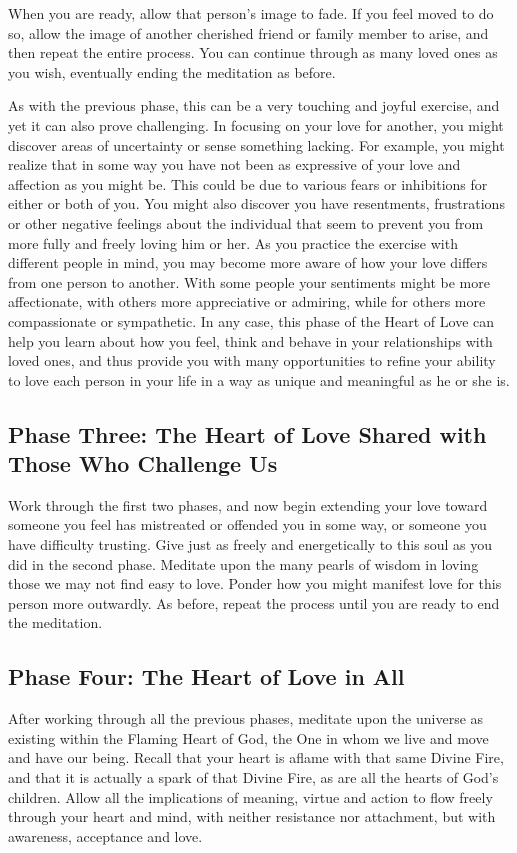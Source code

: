 \documentclass{article}
\begin{document}
When you are ready, allow that person’s image to fade. If you feel moved to do so, allow
the image of another cherished friend or family member to arise, and then repeat the
entire process. You can continue through as many loved ones as you wish, eventually
ending the meditation as before.

As with the previous phase, this can be a very touching and joyful exercise, and yet it can
also prove challenging. In focusing on your love for another, you might discover areas of uncertainty or sense something lacking. For example, you might realize that in some way
you have not been as expressive of your love and affection as you might be. This could
be due to various fears or inhibitions for either or both of you. You might also discover
you have resentments, frustrations or other negative feelings about the individual that
seem to prevent you from more fully and freely loving him or her. As you practice the
exercise with different people in mind, you may become more aware of how your love
differs from one person to another. With some people your sentiments might be more
affectionate, with others more appreciative or admiring, while for others more
compassionate or sympathetic. In any case, this phase of the Heart of Love can help you
learn about how you feel, think and behave in your relationships with loved ones, and
thus provide you with many opportunities to refine your ability to love each person in
your life in a way as unique and meaningful as he or she is.

\subsection*{Phase Three: The Heart of Love Shared with Those Who Challenge Us}

Work through the first two phases, and now begin extending your love toward someone
you feel has mistreated or offended you in some way, or someone you have difficulty
trusting. Give just as freely and energetically to this soul as you did in the second phase.
Meditate upon the many pearls of wisdom in loving those we may not find easy to love.
Ponder how you might manifest love for this person more outwardly. As before, repeat
the process until you are ready to end the meditation.

\subsection*{Phase Four: The Heart of Love in All}

After working through all the previous phases, meditate upon the universe as existing
within the Flaming Heart of God, the One in whom we live and move and have our
being. Recall that your heart is aflame with that same Divine Fire, and that it is actually a
spark of that Divine Fire, as are all the hearts of God’s children. Allow all the
implications of meaning, virtue and action to flow freely through your heart and mind,
with neither resistance nor attachment, but with awareness, acceptance and love.
\end{document}
